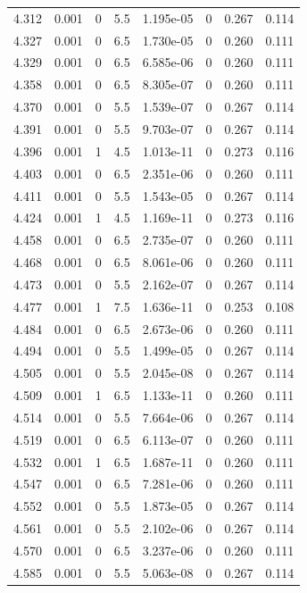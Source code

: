\documentclass[preview]{standalone}
\begin{document}
{{{{{{{{{{\begin{tabular}{L{1.2cm}C{1.2cm} C{0.3cm}C{0.5cm} C{1.4cm}C{1.4cm} C{1.4cm}C{1.4cm}}
  4.312  &  0.001  & 0     & 5.5 &  1.195e-05  & 0  & 0.267 &  0.114   \\ 
  4.327  &  0.001  & 0     & 6.5 &  1.730e-05  & 0  & 0.260 &  0.111   \\ 
  4.329  &  0.001  & 0     & 6.5 &  6.585e-06  & 0  & 0.260 &  0.111   \\ 
  4.358  &  0.001  & 0     & 6.5 &  8.305e-07  & 0  & 0.260 &  0.111   \\ 
  4.370  &  0.001  & 0     & 5.5 &  1.539e-07  & 0  & 0.267 &  0.114   \\ 
  4.391  &  0.001  & 0     & 5.5 &  9.703e-07  & 0  & 0.267 &  0.114   \\ 
  4.396  &  0.001  & 1     & 4.5 &  1.013e-11  & 0  & 0.273 &  0.116   \\ 
  4.403  &  0.001  & 0     & 6.5 &  2.351e-06  & 0  & 0.260 &  0.111   \\ 
  4.411  &  0.001  & 0     & 5.5 &  1.543e-05  & 0  & 0.267 &  0.114   \\ 
  4.424  &  0.001  & 1     & 4.5 &  1.169e-11  & 0  & 0.273 &  0.116   \\ 
  4.458  &  0.001  & 0     & 6.5 &  2.735e-07  & 0  & 0.260 &  0.111   \\ 
  4.468  &  0.001  & 0     & 6.5 &  8.061e-06  & 0  & 0.260 &  0.111   \\ 
  4.473  &  0.001  & 0     & 5.5 &  2.162e-07  & 0  & 0.267 &  0.114   \\ 
  4.477  &  0.001  & 1     & 7.5 &  1.636e-11  & 0  & 0.253 &  0.108   \\ 
  4.484  &  0.001  & 0     & 6.5 &  2.673e-06  & 0  & 0.260 &  0.111   \\ 
  4.494  &  0.001  & 0     & 5.5 &  1.499e-05  & 0  & 0.267 &  0.114   \\ 
  4.505  &  0.001  & 0     & 5.5 &  2.045e-08  & 0  & 0.267 &  0.114   \\ 
  4.509  &  0.001  & 1     & 6.5 &  1.133e-11  & 0  & 0.260 &  0.111   \\ 
  4.514  &  0.001  & 0     & 5.5 &  7.664e-06  & 0  & 0.267 &  0.114   \\ 
  4.519  &  0.001  & 0     & 6.5 &  6.113e-07  & 0  & 0.260 &  0.111   \\ 
  4.532  &  0.001  & 1     & 6.5 &  1.687e-11  & 0  & 0.260 &  0.111   \\ 
  4.547  &  0.001  & 0     & 6.5 &  7.281e-06  & 0  & 0.260 &  0.111   \\ 
  4.552  &  0.001  & 0     & 5.5 &  1.873e-05  & 0  & 0.267 &  0.114   \\ 
  4.561  &  0.001  & 0     & 5.5 &  2.102e-06  & 0  & 0.267 &  0.114   \\ 
  4.570  &  0.001  & 0     & 6.5 &  3.237e-06  & 0  & 0.260 &  0.111   \\ 
  4.585  &  0.001  & 0     & 5.5 &  5.063e-08  & 0  & 0.267 &  0.114   \\ 
\hline 
\end{tabular} 

}}}}}}}}}}
\end{document}
